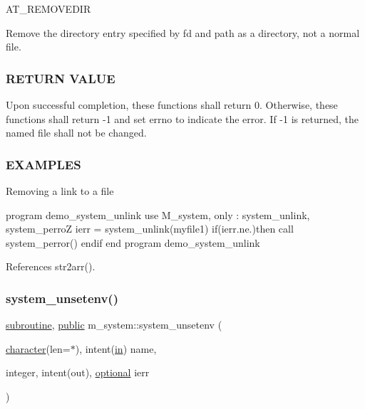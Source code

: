 A\+T\+\_\+\+R\+E\+M\+O\+V\+E\+D\+IR

Remove the directory entry specified by fd and path as a directory, not a normal file.

\subsubsection*{R\+E\+T\+U\+RN V\+A\+L\+UE}

\begin{DoxyVerb}Upon successful completion, these functions shall return 0. Otherwise,
these functions shall return -1 and set  errno  to indicate the error. If
-1 is returned, the named file shall not be changed.
\end{DoxyVerb}


\subsubsection*{E\+X\+A\+M\+P\+L\+ES}

Removing a link to a file

program demo\+\_\+system\+\_\+unlink use M\+\_\+system, only \+: system\+\_\+unlink, system\+\_\+perroZ ierr = system\+\_\+unlink(\textquotesingle{}myfile1\textquotesingle{}) if(ierr.\+ne.)then call system\+\_\+perror(\textquotesingle{}) endif end program demo\+\_\+system\+\_\+unlink 

References str2arr().

\mbox{\label{namespacem__system_a61b67b46b35490ec308773b65c3376a3}} 
\subsubsection{\texorpdfstring{system\+\_\+unsetenv()}{system\_unsetenv()}}
{\footnotesize\ttfamily \hyperlink{M__stopwatch_83_8txt_acfbcff50169d691ff02d4a123ed70482}{subroutine}, \hyperlink{M__stopwatch_83_8txt_a2f74811300c361e53b430611a7d1769f}{public} m\+\_\+system\+::system\+\_\+unsetenv (\begin{DoxyParamCaption}\item[{\hyperlink{option__stopwatch_83_8txt_abd4b21fbbd175834027b5224bfe97e66}{character}(len=$\ast$), intent(\hyperlink{M__journal_83_8txt_afce72651d1eed785a2132bee863b2f38}{in})}]{name,  }\item[{integer, intent(out), \hyperlink{option__stopwatch_83_8txt_aa4ece75e7acf58a4843f70fe18c3ade5}{optional}}]{ierr }\end{DoxyParamCaption})}



